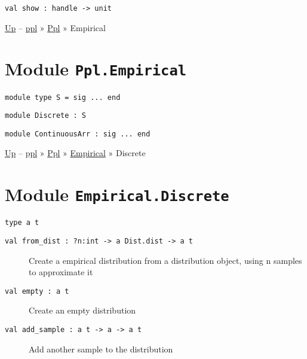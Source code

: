 \protect\hyperlink{val-show}{}\texttt{val\ show\ :\ handle\ -\textgreater{}\ unit}

\href{../index.html}{Up} -- \href{../../index.html}{ppl} »
\href{../index.html}{Ppl} » Empirical

\section{\texorpdfstring{Module
\texttt{Ppl.Empirical}}{Module Ppl.Empirical}}\label{module-ppl.empirical}

\hypertarget{module-type-S}{}
\protect\hyperlink{module-type-S}{}\texttt{module\ type\ S\ =\ sig\ ...\ end}

\hypertarget{module-Discrete}{}
\protect\hyperlink{module-Discrete}{}\texttt{module\ Discrete\ :\ S}

\hypertarget{module-ContinuousArr}{}
\protect\hyperlink{module-ContinuousArr}{}\texttt{module\ ContinuousArr\ :\ sig\ ...\ end}

\href{../index.html}{Up} -- \href{../../../index.html}{ppl} »
\href{../../index.html}{Ppl} » \href{../index.html}{Empirical} »
Discrete

\section{\texorpdfstring{Module
\texttt{Empirical.Discrete}}{Module Empirical.Discrete}}\label{module-empirical.discrete}

\protect\hyperlink{type-t}{}\texttt{type\ \textquotesingle{}a\ t}

\begin{description}
\item[{\protect\hyperlink{val-fromux5fdist}{}\texttt{val\ from\_dist\ :\ ?⁠n:int\ -\textgreater{}\ \textquotesingle{}a\ Dist.dist\ -\textgreater{}\ \textquotesingle{}a\ t}}]
Create a empirical distribution from a distribution object, using n
samples to approximate it
\end{description}

\begin{description}
\item[{\protect\hyperlink{val-empty}{}\texttt{val\ empty\ :\ \textquotesingle{}a\ t}}]
Create an empty distribution
\end{description}

\begin{description}
\item[{\protect\hyperlink{val-addux5fsample}{}\texttt{val\ add\_sample\ :\ \textquotesingle{}a\ t\ -\textgreater{}\ \textquotesingle{}a\ -\textgreater{}\ \textquotesingle{}a\ t}}]
Add another sample to the distribution
\end{description}

